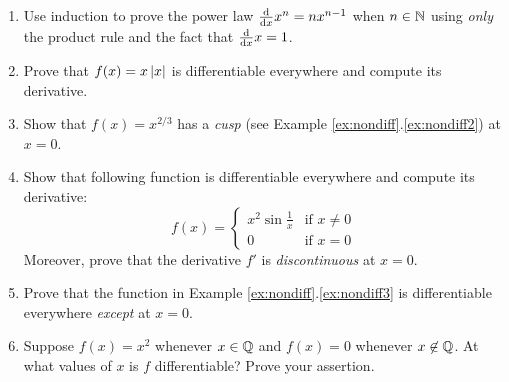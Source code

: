 \begin{exercises}{}
\begin{enumerate}
	  
   	\item Use induction to prove the power law $\frac{\mathrm{d} }{\mathrm{d} x}x^n=nx^{n-1}$ when $n\in\mathbb{N}$ using \emph{only} the product rule and the fact that $\frac{\mathrm{d} }{\mathrm{d} x}x=1$.
   		  
	  
	  \item Prove that $f(x)=x\left| x\right|$ is differentiable everywhere and compute its derivative.
	  
	  
	  \item Show that $f(x)=x^{2/3}$ has a \emph{cusp} (see Example \ref*{ex:nondiff}.\ref{ex:nondiff2}) at $x=0$.
	  	  
	  
	  \item\label{exs:diffdiscont} Show that following function is differentiable everywhere and compute its derivative:
	  \[
	  	f(x)=
	  	\begin{cases}
	  		x^2\sin\frac 1x&\text{if }x\neq 0\\
	  		0&\text{if }x=0
	  	\end{cases}
	  \]
	  Moreover, prove that the derivative $f'$ is \emph{discontinuous} at $x=0$.
	  
	  
	  \item\label{ex:diffnonzero} Prove that the function in Example \ref*{ex:nondiff}.\ref{ex:nondiff3}
	  is differentiable everywhere \emph{except} at $x=0$.
	  
	  
	  \item Suppose $f(x)=x^2$ whenever $x\in\mathbb{Q}$ and $f(x)=0$ whenever $x\not\in\mathbb{Q}$. At what values of $x$ is $f$ differentiable? Prove your assertion.
	  

\end{enumerate}
\end{exercises}

